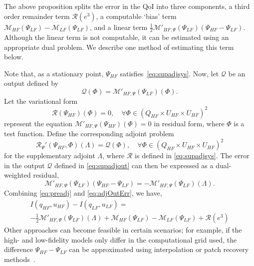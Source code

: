 The above proposition splits the error in the QoI into three components, a third order remainder term $\mathcal{R}(e^3)$, a computable `bias' term $\mathcal{M}_{HF}(\Psi_{LF})-\mathcal{M}_{LF}(\Psi_{LF})$, and a linear term $\frac{1}{2}\mathcal{M}'_{HF,\Psi}(\Psi_{LF})(\Psi_{HF}-\Psi_{LF})$. Although the linear term is not computable, it can be estimated using an appropriate dual problem. We describe one method of estimating this term below.

Note that, as a stationary point, $\Psi_{HF}$ satisfies~\cref{eq:supadjsys}. Now, let $\mathcal{Q}$ be an output defined by
%
\begin{equation}
\mathcal{Q}(\Phi)=\mathcal{M}'_{HF,\Psi}(\Psi_{LF})(\Phi).
\label{eq:supadjout}
\end{equation}
%
Let the variational form
%
\begin{equation}
\mathscr{R}(\Psi_{HF})(\Phi)=0,\quad\forall\Phi\in(Q_{HF}\times U_{HF}\times U_{HF})^2
\label{eq:supadjsys}
\end{equation}
%
represent the equation $\mathcal{M}'_{HF,\Psi}(\Psi_{HF})(\Phi)=0$ in residual form, where $\Phi$ is a test function. Define the corresponding adjoint problem
%
\begin{equation}
\mathscr{R}_{\Psi}'(\Psi_{HF},\Phi)(\Lambda)=\mathcal{Q}(\Phi),\quad\forall\Phi\in(Q_{HF}\times U_{HF}\times U_{HF})^2
\label{eq:superAdjEq}
\end{equation}
for the supplementary adjoint $\Lambda$, where $\mathscr{R}$ is defined in \cref{eq:supadjsys}. The error in the output $\mathcal{Q}$ defined in \cref{eq:supadjout} can then be expressed as a dual-weighted residual,
\begin{equation}
\label{eq:adjOutErr}
\mathcal M'_{HF,\Psi}(\Psi_{LF})(\Psi_{HF}-\Psi_{LF})=-\mathcal{M}'_{HF,\Psi}(\Psi_{LF})(\Lambda).
\end{equation}
%
Combining \cref{eq:preadj} and \cref{eq:adjOutErr}, we have,
\begin{multline}
\label{eq:finErrExp}
I(q_{HF},u_{HF})-I(q_{LF},u_{LF})=\\-\frac{1}{2}\mathcal{M}'_{HF,\Psi}(\Psi_{LF})(\Lambda)+\mathcal M_{HF}(\Psi_{LF})-\mathcal M_{LF}(\Psi_{LF})+\mathcal{R}(e^3)
\end{multline}
%
Other approaches can become feasible in certain scenarios; for example, if the high- and low-fidelity models only differ in the computational grid used, the difference $\Psi_{HF}-\Psi_{LF}$ can be approximated using interpolation or patch recovery methods~\cite{BecVex05}.
